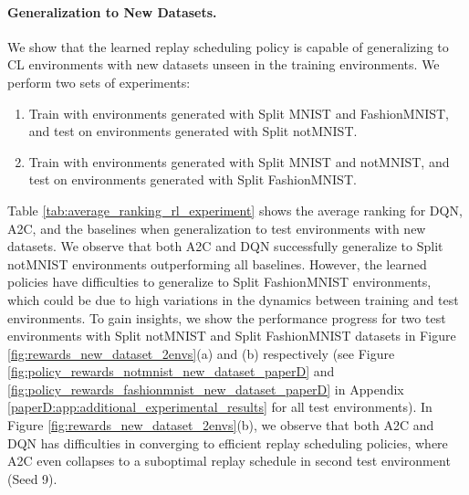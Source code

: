 \paragraph{Generalization to New Datasets.}
We show that the learned replay scheduling policy is capable of generalizing to CL environments with new datasets unseen in the training environments. We perform two sets of experiments:
\begin{enumerate}[topsep=1pt,noitemsep]
	\item Train with environments generated with Split MNIST and FashionMNIST, and test on environments generated with Split notMNIST.
	\item Train with environments generated with Split MNIST and notMNIST, and test on environments generated with Split FashionMNIST.
\end{enumerate}
Table \ref{tab:average_ranking_rl_experiment} shows the average ranking for DQN, A2C, and the baselines when generalization to test environments with new datasets. We observe that both A2C and DQN successfully generalize to Split notMNIST environments outperforming all baselines. 
However, the learned policies have difficulties to generalize to Split FashionMNIST environments, which could be due to 
high variations in the dynamics between training and test environments.
To gain insights, we show the performance progress for two test environments with Split notMNIST and Split FashionMNIST datasets in Figure \ref{fig:rewards_new_dataset_2envs}(a) and (b) respectively (see Figure \ref{fig:policy_rewards_notmnist_new_dataset_paperD} and \ref{fig:policy_rewards_fashionmnist_new_dataset_paperD} in Appendix \ref{paperD:app:additional_experimental_results} for all test environments). 
In Figure \ref{fig:rewards_new_dataset_2envs}(b), we observe that both A2C and DQN has difficulties in converging to efficient replay scheduling policies, where A2C even collapses to a suboptimal replay schedule in second test environment (Seed 9).  
